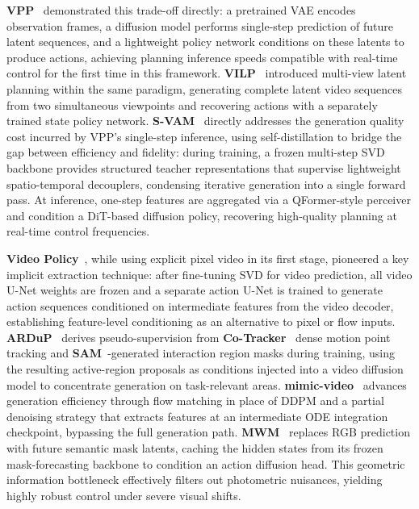 \textbf{VPP}~\cite{hu2024vpp} demonstrated this trade-off directly: a pretrained VAE encodes observation frames, a diffusion model performs single-step prediction of future latent sequences, and a lightweight policy network conditions on these latents to produce actions, achieving planning inference speeds compatible with real-time control for the first time in this framework. \textbf{VILP}~\cite{xu2025vilp} introduced multi-view latent planning within the same paradigm, generating complete latent video sequences from two simultaneous viewpoints and recovering actions with a separately trained state policy network.
\textbf{S-VAM}~\cite{yan2026svam} directly addresses the generation quality cost incurred by VPP's single-step inference, using self-distillation to bridge the gap between efficiency and fidelity: during training, a frozen multi-step SVD backbone provides structured teacher representations that supervise lightweight spatio-temporal decouplers, condensing iterative generation into a single forward pass. At inference, one-step features are aggregated via a QFormer-style perceiver and condition a DiT-based diffusion policy, recovering high-quality planning at real-time control frequencies.


\textbf{Video Policy}~\cite{liang2025videopolicy}, while using explicit pixel video in its first stage, pioneered a key implicit extraction technique: after fine-tuning SVD for video prediction, all video U-Net weights are frozen and a separate action U-Net is trained to generate action sequences conditioned on intermediate features from the video decoder, establishing feature-level conditioning as an alternative to pixel or flow inputs. \textbf{ARDuP}~\cite{huang2024ardup} derives pseudo-supervision from \textbf{Co-Tracker}~\cite{karaev2023cotracker} dense motion point tracking and \textbf{SAM}~\cite{kirillov2023sam}-generated interaction region masks during training, using the resulting active-region proposals as conditions injected into a video diffusion model to concentrate generation on task-relevant areas. \textbf{mimic-video}~\cite{pai2025mimicvideo} advances generation efficiency through flow matching in place of DDPM and a partial denoising strategy that extracts features at an intermediate ODE integration checkpoint, bypassing the full generation path. \textbf{MWM}~\cite{lou2026mwm} replaces RGB prediction with future semantic mask latents, caching the hidden states from its frozen mask-forecasting backbone to condition an action diffusion head. This geometric information bottleneck effectively filters out photometric nuisances, yielding highly robust control under severe visual shifts.

